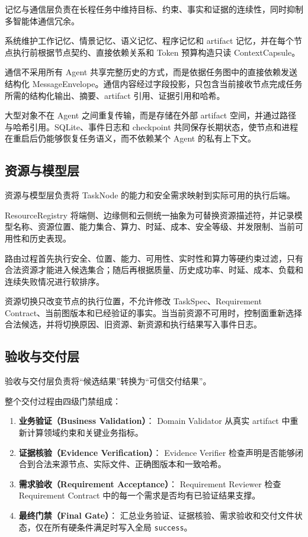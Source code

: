 \documentclass[UTF8,a4paper,12pt,oneside]{ctexbook}
\begin{document}
记忆与通信层负责在长程任务中维持目标、约束、事实和证据的连续性，同时抑制多智能体通信冗余。

系统维护工作记忆、情景记忆、语义记忆、程序记忆和 artifact 记忆，并在每个节点执行前根据节点契约、直接依赖关系和 Token 预算构造只读 ContextCapsule。

通信不采用所有 Agent 共享完整历史的方式，而是依据任务图中的直接依赖发送结构化 MessageEnvelope。通信内容经过字段投影，只包含当前接收节点完成任务所需的结构化输出、摘要、artifact 引用、证据引用和哈希。

大型对象不在 Agent 之间重复传输，而是存储在外部 artifact 空间，并通过路径与哈希引用。SQLite、事件日志和 checkpoint 共同保存长期状态，使节点和进程在重启后仍能够恢复任务语义，而不依赖某个 Agent 的私有上下文。


\subsection{资源与模型层}

资源与模型层负责将 TaskNode 的能力和安全需求映射到实际可用的执行后端。

ResourceRegistry 将端侧、边缘侧和云侧统一抽象为可替换资源描述符，并记录模型名称、资源位置、能力集合、算力、时延、成本、安全等级、并发限制、当前可用性和历史表现。

路由过程首先执行安全、位置、能力、可用性、实时性和算力等硬约束过滤，只有合法资源才能进入候选集合；随后再根据质量、历史成功率、时延、成本、负载和连续失败情况进行软排序。

资源切换只改变节点的执行位置，不允许修改 TaskSpec、Requirement Contract、当前图版本和已经验证的事实。当当前资源不可用时，控制面重新选择合法候选，并将切换原因、旧资源、新资源和执行结果写入事件日志。


\subsection{验收与交付层}

验收与交付层负责将“候选结果”转换为“可信交付结果”。

整个交付过程由四级门禁组成：

\begin{enumerate}
    \item \textbf{业务验证（Business Validation）}：
    Domain Validator 从真实 artifact 中重新计算领域约束和关键业务指标。

    \item \textbf{证据核验（Evidence Verification）}：
    Evidence Verifier 检查声明是否能够闭合到合法来源节点、实际文件、正确图版本和一致哈希。

    \item \textbf{需求验收（Requirement Acceptance）}：
    Requirement Reviewer 检查 Requirement Contract 中的每一个需求是否均有已验证结果支撑。

    \item \textbf{最终门禁（Final Gate）}：
    汇总业务验证、证据核验、需求验收和交付文件状态，仅在所有硬条件满足时写入全局 \texttt{success}。
\end{enumerate}
\end{document}
